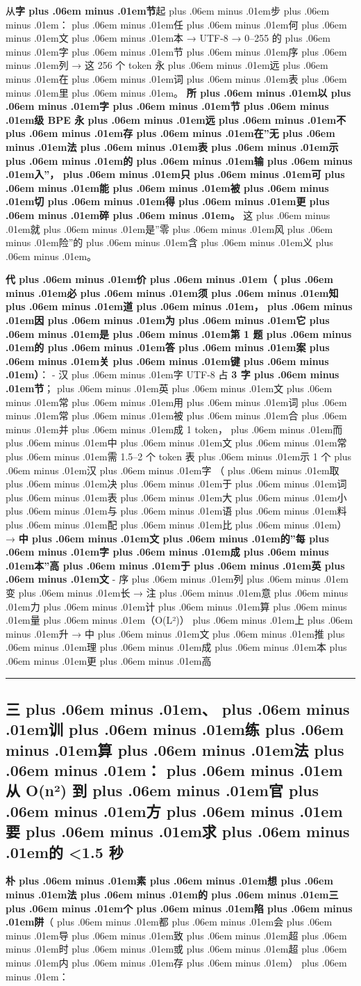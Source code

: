 \documentclass[
]{article}
\def\zh#1{{\zhfont #1}}
\def\sym#1{{\symfont #1}}
\def\zhglue{\hskip0pt plus .06em minus .01em}
\begin{document}
\zh{从}\textbf{\zh{字\zhglue 节}}\zh{起\zhglue 步\zhglue ：\zhglue 任\zhglue 何\zhglue 文\zhglue 本} \sym{→} UTF-8 \sym{→} 0--255 \zh{的\zhglue 字\zhglue 节\zhglue 序\zhglue 列} \sym{→} \zh{这} 256 \zh{个} token \zh{永\zhglue 远\zhglue 在\zhglue 词\zhglue 表\zhglue 里\zhglue 。} \textbf{\zh{所\zhglue 以\zhglue 字\zhglue 节\zhglue 级} BPE \zh{永\zhglue 远\zhglue 不\zhglue 存\zhglue 在}''\zh{无\zhglue 法\zhglue 表\zhglue 示\zhglue 的\zhglue 输\zhglue 入}''\zh{，\zhglue 只\zhglue 可\zhglue 能\zhglue 被\zhglue 切\zhglue 得\zhglue 更\zhglue 碎\zhglue 。}} \zh{这\zhglue 就\zhglue 是}''\zh{零\zhglue 风\zhglue 险}''\zh{的\zhglue 含\zhglue 义\zhglue 。}

\textbf{\zh{代\zhglue 价\zhglue （\zhglue 必\zhglue 须\zhglue 知\zhglue 道\zhglue ，\zhglue 因\zhglue 为\zhglue 它\zhglue 是\zhglue 第} 1 \zh{题\zhglue 的\zhglue 答\zhglue 案\zhglue 关\zhglue 键\zhglue ）}}\zh{：} - \zh{汉\zhglue 字} UTF-8 \zh{占} \textbf{3 \zh{字\zhglue 节}}\zh{；\zhglue 英\zhglue 文\zhglue 常\zhglue 用\zhglue 词\zhglue 常\zhglue 被\zhglue 合\zhglue 并\zhglue 成} 1 token\zh{，\zhglue 而\zhglue 中\zhglue 文\zhglue 常\zhglue 需} 1.5--2 \zh{个} token \zh{表\zhglue 示} 1 \zh{个\zhglue 汉\zhglue 字} \zh{（\zhglue 取\zhglue 决\zhglue 于\zhglue 词\zhglue 表\zhglue 大\zhglue 小\zhglue 与\zhglue 语\zhglue 料\zhglue 配\zhglue 比\zhglue ）}\sym{→} \textbf{\zh{中\zhglue 文\zhglue 的}''\zh{每\zhglue 字\zhglue 成\zhglue 本}''\zh{高\zhglue 于\zhglue 英\zhglue 文}} - \zh{序\zhglue 列\zhglue 变\zhglue 长} \sym{→} \zh{注\zhglue 意\zhglue 力\zhglue 计\zhglue 算\zhglue 量\zhglue （}O(L\sym{²})\zh{）\zhglue 上\zhglue 升} \sym{→} \zh{中\zhglue 文\zhglue 推\zhglue 理\zhglue 成\zhglue 本\zhglue 更\zhglue 高}

\begin{center}\rule{0.5\linewidth}{0.5pt}\end{center}

\subsection{\zh{三\zhglue 、\zhglue 训\zhglue 练\zhglue 算\zhglue 法\zhglue ：\zhglue 从} O(n\sym{²}) \zh{到\zhglue 官\zhglue 方\zhglue 要\zhglue 求\zhglue 的} \textless1.5 \zh{秒}}\label{ux4e09ux8badux7ec3ux7b97ux6cd5ux4ece-onuxb2-ux5230ux5b98ux65b9ux8981ux6c42ux7684-1.5-ux79d2}

\textbf{\zh{朴\zhglue 素\zhglue 想\zhglue 法\zhglue 的\zhglue 三\zhglue 个\zhglue 陷\zhglue 阱}}\zh{（\zhglue 都\zhglue 会\zhglue 导\zhglue 致\zhglue 超\zhglue 时\zhglue 或\zhglue 超\zhglue 内\zhglue 存\zhglue ）\zhglue ：}
\end{document}
